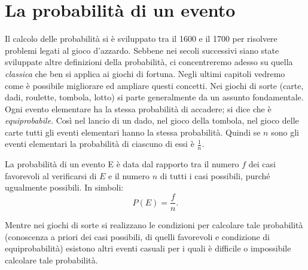 \section{La probabilità di un evento}
\label{sec:02_definizioni}
Il calcolo delle probabilità si è sviluppato tra il 1600 e il 1700 per 
risolvere problemi legati al gioco d'azzardo. Sebbene nei secoli successivi 
siano state sviluppate altre definizioni della probabilità, ci concentreremo 
adesso su quella \emph{classica} che ben si applica ai giochi di fortuna. Negli 
ultimi capitoli vedremo come è possibile migliorare ed ampliare questi concetti.
Nei giochi di sorte (carte, dadi, roulette, tombola, lotto) si parte 
generalmente da un assunto fondamentale. Ogni evento elementare ha la stessa 
probabilità di accadere; si dice che è \emph{equiprobabile}.
Così nel lancio di un dado, nel gioco della tombola, nel 
gioco delle carte tutti gli eventi elementari hanno la stessa probabilità. 
Quindi se $n$ sono gli eventi elementari la probabilità di ciascuno di essi è 
$\frac 1 n$.

La probabilità di un evento E è data dal rapporto tra il numero $f$ dei casi 
favorevoli al verificarsi di $E$ e il numero $n$ di tutti i casi possibili, 
purché ugualmente possibili. In simboli: \[ P(E)=\dfrac f n. \]

Mentre nei giochi di sorte si realizzano le condizioni per calcolare tale 
probabilità (conoscenza a priori dei casi possibili, di quelli favorevoli e 
condizione di equiprobabilità) esistono altri eventi casuali per i quali è 
difficile o impossibile calcolare tale probabilità.

